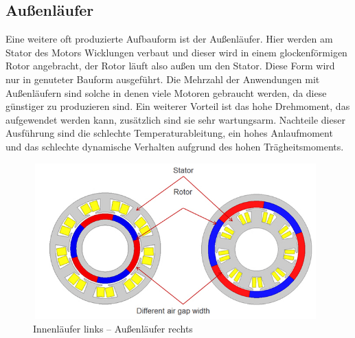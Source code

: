 \subsection{Au{\ss}enläufer}
Eine weitere oft produzierte Aufbauform ist der Au{\ss}enläufer. Hier werden am Stator des Motors Wicklungen verbaut und dieser wird in einem glockenförmigen Rotor angebracht, der Rotor läuft also au{\ss}en um den Stator. Diese Form wird nur in genuteter Bauform ausgeführt. Die Mehrzahl der Anwendungen mit Au{\ss}enläufern sind solche in denen viele Motoren gebraucht werden, da diese günstiger zu produzieren sind. Ein weiterer Vorteil ist das hohe Drehmoment, das aufgewendet werden kann, zusätzlich sind sie sehr wartungsarm. Nachteile dieser Ausführung sind die schlechte Temperaturableitung, ein hohes Anlaufmoment und das schlechte dynamische Verhalten aufgrund des hohen Trägheitsmoments. 
\cite{nanotec:BLDC}
\cite{lgeeks:BLDC}
\begin{figure}[h]
    \begin{center}
        \includegraphics[width=11cm, height= 6cm]{images/Abbildung1.jpg}
        \caption{Innenläufer links – Au{\ss}enläufer rechts 
        \cite{cdyn:BLDC}}
        \label{Innen/Aussenlaeufer}
        \end{center}
\end{figure}

